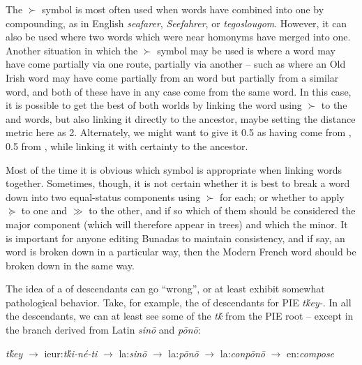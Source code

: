 \documentclass[output=paper,colorlinks,citecolor=brown]{langscibook}
\begin{document}
The ${\succ}$ symbol is most often used when words have combined into one by compounding, as in English \textit{seafarer},  \textit{Seefahrer}, or  \textit{tegoslougom}. However, it can also be used where two words which were near homonyms have merged into one. Another situation in which the ${\succ}$ symbol may be used is where a word may have come partially via one route, partially via another – such as where an Old Irish word may have come partially from an  word but partially from a similar  word, and both of these have in any case come from the same  word. In this case, it is possible to get the best of both worlds by linking the  word using ${\succ}$ to the  and  words, but also linking it directly to the  ancestor, maybe setting the distance metric here as 2. Alternately, we might want to give it  0.5 as having come from , 0.5 from , while linking it with certainty to the  ancestor.

Most of the time it is obvious which symbol is appropriate when linking words together. Sometimes, though, it is not certain whether it is best to break a word down into two equal-status components using ${\succ}$ for each; or whether to apply ${\succcurlyeq}$ to one and ${\gg}$ to the other, and if so which of them should be considered the major component (which will therefore appear in trees) and which the minor. It is important for anyone editing Bunadas to maintain consistency, and if say, an  word is broken down in a particular way, then the Modern French word should be broken down in the same way.

The idea of a  of descendants can go ``wrong”, or at least exhibit somewhat pathological behavior. Take, for example, the  of descendants for PIE \textit{tḱey{}-}. In all the descendants, we can at least see some  of the \textit{tḱ} from the PIE root – except in the branch derived from Latin \textit{sinō} and \textit{pōnō}:

\ea
\textit{tḱey} $\rightarrow$ ieur:\textit{tḱi{}-né-ti} $\rightarrow$ la:\textit{sinō} $\rightarrow$ la:\textit{pōnō} $\rightarrow$ la:\textit{conpōnō} $\rightarrow$ en:\textit{compose}
\z
\end{document}
